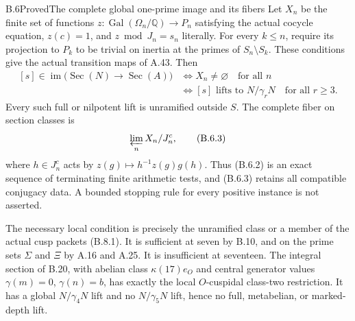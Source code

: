 \begin{statement}{B.6}{Proved}{The complete global one-prime image and its fibers}
Let $X_n$ be the finite set of functions
$z:\operatorname{Gal}(\Omega_n/\mathbb Q)\to P_n$
satisfying the actual cocycle equation,
$z(c)=1$, and $z\bmod J_n=s_n$ literally.
For every $k\le n$, require its projection to
$P_k$ to be trivial on inertia at the primes
of $S_n\setminus S_k$. These conditions give
the actual transition maps of A.43. Then
\[
 \begin{split}
 [s]\in\operatorname{im}\bigl(\operatorname{Sec}(N)
          \longrightarrow\operatorname{Sec}(A)\bigr)
 &\Longleftrightarrow X_n\ne\varnothing\quad\text{for all }n\\
 &\Longleftrightarrow
 [s]\text{ lifts to }N/\gamma_rN
                    \quad\text{for all }r\ge3.
 \end{split}                                               \tag{B.6.2}
\]
Every such full or nilpotent lift is unramified
outside $S$. The complete fiber on section classes is
\[
                 \varprojlim_n X_n/J_n^c,                  \tag{B.6.3}
\]
where $h\in J_n^c$ acts by
$z(g)\mapsto h^{-1}z(g)g(h)$.
Thus (B.6.2) is an exact sequence of terminating
finite arithmetic tests, and (B.6.3) retains all
compatible conjugacy data. A bounded stopping rule
for every positive instance is not asserted.

The necessary local condition is precisely the
unramified class or a member of the actual cusp
packets (B.8.1). It is sufficient at seven by
B.10, and on the prime sets $\Sigma$ and $\Xi$
by A.16 and A.25. It is insufficient at seventeen.
The integral section of B.20, with abelian class
$\kappa(17)e_O$ and central generator values
$\gamma(m)=0$, $\gamma(n)=b$, has exactly the
local $O$-cuspidal class-two restriction. It has
a global $N/\gamma_4N$ lift and no
$N/\gamma_5N$ lift, hence no full, metabelian,
or marked-depth lift.
\end{statement}
